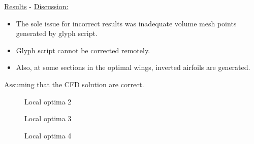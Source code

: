 \begin{frame}[allowframebreaks]{\underline{Results} -}
\underline{Discussion:}
\begin{itemize}
\item The sole issue for incorrect results was inadequate volume mesh points generated by glyph script.
\item Glyph script cannot be corrected remotely.
\item Also, at some sections in the optimal
wings, inverted airfoils are generated.
\end{itemize}
Assuming that the CFD solution are correct.


\begin{figure} 
    \centering
    \caption{Local optima 2}
    \label{local optima 2}
\end{figure}

\begin{figure} 
    \centering
    \caption{Local optima 3}
    \label{local optima 3}
\end{figure}

\begin{figure}
    \centering
    \caption{Local optima 4}
    \label{local optima 4}
\end{figure}


\end{frame}
